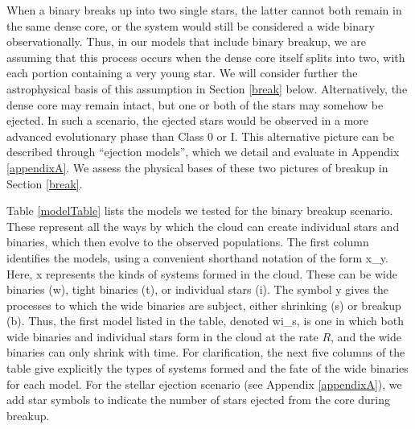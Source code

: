 \documentclass[usenatbib,a4paper]{mnras}
\begin{document}
When a binary breaks up into two single stars, the latter cannot both remain in the same dense core, or the system would still be considered a wide binary observationally.  Thus, in our models that include binary breakup, we are assuming that this process occurs when the dense core itself splits into two, with each portion containing a very young star. We will consider further the astrophysical basis of this assumption in Section \ref{break} below.  Alternatively, the dense core may remain intact, but one or both of the stars may somehow be ejected.  In such a scenario, the ejected stars would be observed in a more advanced evolutionary phase than Class 0 or I.  This alternative picture can be described through ``ejection models'', which we detail and evaluate in Appendix \ref{appendixA}.  We assess the physical bases of these two pictures of breakup in Section \ref{break}. 

Table \ref{modelTable} lists the models we tested for the binary breakup scenario.  These represent all the ways by which the cloud can create individual stars and binaries, which then evolve to the observed populations.  The first column identifies the models, using a convenient shorthand notation of the form x\_y.  Here, x represents the kinds of systems formed in the cloud.  These can be wide binaries (w), tight binaries (t), or individual stars (i).  The symbol y gives the processes to which the wide binaries are subject, either shrinking (s) or breakup (b).  Thus, the first model listed in the table, denoted wi\_s, is one in which both wide binaries and individual stars form in the cloud at the rate $R$, and the wide binaries can only shrink with time.  For clarification, the next five columns of the table give explicitly the types of systems formed and the fate of the wide binaries for each model.  For the stellar ejection scenario (see Appendix \ref{appendixA}), we add star symbols to indicate the number of stars ejected from the core during breakup.
\end{document}
